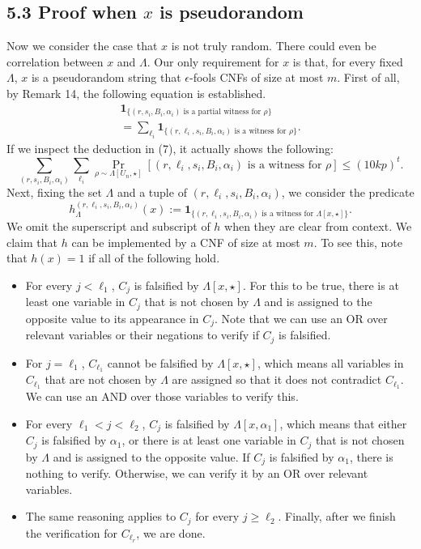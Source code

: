 \subsection*{5.3 Proof when $x$ is pseudorandom}
Now we consider the case that $x$ is not truly random. There could even be correlation between $x$ and $\Lambda$. Our only requirement for $x$ is that, for every fixed $\Lambda$, $x$ is a pseudorandom string that $\epsilon$-fools CNFs of size at most $m$. First of all, by Remark 14, the following equation is established.
\begin{multline*}\mathbf1_{\{(r,s_i,B_i,\alpha_i)\text{ is a partial witness for }\rho\}}\\=\sum_{\ell_i}\mathbf1_{\{(r,\ell_i,s_i,B_i,\alpha_i)\text{ is a witness for }\rho\}}.\tag{8}\end{multline*}
If we inspect the deduction in (7), it actually shows the following:
\[\sum_{(r,s_i,B_i,\alpha_i)}\sum_{\ell_i}\Pr_{\rho\sim\Lambda[U_n,\star]}[(r,\ell_i,s_i,B_i,\alpha_i)\text{ is a witness for }\rho]\le(10kp)^t.\tag{9}\]
Next, fixing the set $\Lambda$ and a tuple of $(r,\ell_i,s_i,B_i,\alpha_i)$, we consider the predicate
\[h_\Lambda^{(r,\ell_i,s_i,B_i,\alpha_i)}(x):=\mathbf1_{\{(r,\ell_i,s_i,B_i,\alpha_i)\text{ is a witness for }\Lambda[x,\star]\}}.\]
We omit the superscript and subscript of $h$ when they are clear from context. We claim that $h$ can be implemented by a CNF of size at most $m$. To see this, note that $h(x)=1$ if all of the following hold.
\begin{itemize}\item For every $j<\ell_1$, $C_j$ is falsified by $\Lambda[x,\star]$. For this to be true, there is at least one variable in $C_j$ that is not chosen by $\Lambda$ and is assigned to the opposite value to its appearance in $C_j$. Note that we can use an OR over relevant variables or their negations to verify if $C_j$ is falsified.
\item For $j=\ell_1$, $C_{\ell_1}$ cannot be falsified by $\Lambda[x,\star]$, which means all variables in $C_{\ell_1}$ that are not chosen by $\Lambda$ are assigned so that it does not contradict $C_{\ell_1}$. We can use an AND over those variables to verify this.
\item For every $\ell_1<j<\ell_2$, $C_j$ is falsified by $\Lambda[x,\alpha_1]$, which means that either $C_j$ is falsified by $\alpha_1$, or there is at least one variable in $C_j$ that is not chosen by $\Lambda$ and is assigned to the opposite value. If $C_j$ is falsified by $\alpha_1$, there is nothing to verify. Otherwise, we can verify it by an OR over relevant variables.
\item The same reasoning applies to $C_j$ for every $j\ge\ell_2$. Finally, after we finish the verification for $C_{\ell_r}$, we are done.\end{itemize}

